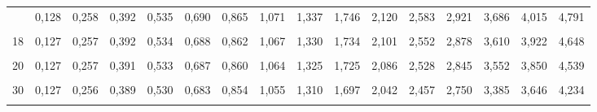 \documentclass[
  ngerman,
]{article}
\begin{document}
\begin{table}[!h]
{\begin{tabular}{>{}r|rrrrrrrrrrrrrrr}
\addlinespace
16 & 0,128 & 0,258 & 0,392 & 0,535 & 0,690 & 0,865 & 1,071 & 1,337 & 1,746 & 2,120 & 2,583 & 2,921 & 3,686 & 4,015 & 4,791\\
\cellcolor{gray!6}{17} & \cellcolor{gray!6}{0,128} & \cellcolor{gray!6}{0,257} & \cellcolor{gray!6}{0,392} & \cellcolor{gray!6}{0,534} & \cellcolor{gray!6}{0,689} & \cellcolor{gray!6}{0,863} & \cellcolor{gray!6}{1,069} & \cellcolor{gray!6}{1,333} & \cellcolor{gray!6}{1,740} & \cellcolor{gray!6}{2,110} & \cellcolor{gray!6}{2,567} & \cellcolor{gray!6}{2,898} & \cellcolor{gray!6}{3,646} & \cellcolor{gray!6}{3,965} & \cellcolor{gray!6}{4,714}\\
18 & 0,127 & 0,257 & 0,392 & 0,534 & 0,688 & 0,862 & 1,067 & 1,330 & 1,734 & 2,101 & 2,552 & 2,878 & 3,610 & 3,922 & 4,648\\
\cellcolor{gray!6}{19} & \cellcolor{gray!6}{0,127} & \cellcolor{gray!6}{0,257} & \cellcolor{gray!6}{0,391} & \cellcolor{gray!6}{0,533} & \cellcolor{gray!6}{0,688} & \cellcolor{gray!6}{0,861} & \cellcolor{gray!6}{1,066} & \cellcolor{gray!6}{1,328} & \cellcolor{gray!6}{1,729} & \cellcolor{gray!6}{2,093} & \cellcolor{gray!6}{2,539} & \cellcolor{gray!6}{2,861} & \cellcolor{gray!6}{3,579} & \cellcolor{gray!6}{3,883} & \cellcolor{gray!6}{4,590}\\
20 & 0,127 & 0,257 & 0,391 & 0,533 & 0,687 & 0,860 & 1,064 & 1,325 & 1,725 & 2,086 & 2,528 & 2,845 & 3,552 & 3,850 & 4,539\\
\addlinespace
\cellcolor{gray!6}{25} & \cellcolor{gray!6}{0,127} & \cellcolor{gray!6}{0,256} & \cellcolor{gray!6}{0,390} & \cellcolor{gray!6}{0,531} & \cellcolor{gray!6}{0,684} & \cellcolor{gray!6}{0,856} & \cellcolor{gray!6}{1,058} & \cellcolor{gray!6}{1,316} & \cellcolor{gray!6}{1,708} & \cellcolor{gray!6}{2,060} & \cellcolor{gray!6}{2,485} & \cellcolor{gray!6}{2,787} & \cellcolor{gray!6}{3,450} & \cellcolor{gray!6}{3,725} & \cellcolor{gray!6}{4,352}\\
30 & 0,127 & 0,256 & 0,389 & 0,530 & 0,683 & 0,854 & 1,055 & 1,310 & 1,697 & 2,042 & 2,457 & 2,750 & 3,385 & 3,646 & 4,234\\
\cellcolor{gray!6}{35} & \cellcolor{gray!6}{0,127} & \cellcolor{gray!6}{0,255} & \cellcolor{gray!6}{0,388} & \cellcolor{gray!6}{0,529} & \cellcolor{gray!6}{0,682} & \cellcolor{gray!6}{0,852} & \cellcolor{gray!6}{1,052} & \cellcolor{gray!6}{1,306} & \cellcolor{gray!6}{1,690} & \cellcolor{gray!6}{2,030} & \cellcolor{gray!6}{2,438} & \cellcolor{gray!6}{2,724} & \cellcolor{gray!6}{3,340} & \cellcolor{gray!6}{3,591} & \cellcolor{gray!6}{4,153}\\

\end{tabular}}
\end{table}
\end{document}
